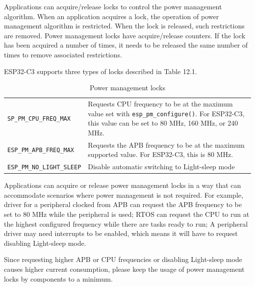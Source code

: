 \documentclass[a4paper,12pt,openany]{book}
\renewcommand{\arraystretch}{1}
\begin{document}
Applications can acquire/release locks to control the power management algorithm. When an application acquires a lock, the operation of power management algorithm is restricted. When the lock is released, such restrictions are removed. Power management locks have acquire/release counters. If the lock has been acquired a number of times, it needs to be released the same number of times to remove associated restrictions.

ESP32-C3 supports three types of locks described in Table 12.1.

\begin{table}[h!]
    \renewcommand{\arraystretch}{1.2}
    \caption{Power management locks}
    \begin{tabular}{|>{\footnotesize}m{}|>{\footnotesize}m{}|}
        \hline
        \rowcolor{LightBlue}\multicolumn{1}{|c|}{\textbf{Power management lock}}&\multicolumn{1}{c|}{\textbf{Description}}\\
        \hline
        \verb|SP_PM_CPU_FREQ_MAX|&Requests CPU frequency to be at the maximum value set with \verb|esp_pm_configure()|. For ESP32-C3, this value can be set to 80 MHz, 160 MHz, or 240 MHz.\\
        \hline
        \verb|ESP_PM_APB_FREQ_MAX|&Requests the APB frequency to be at the maximum supported value. For ESP32-C3, this is 80 MHz.\\
        \hline
        \verb|ESP_PM_NO_LIGHT_SLEEP|&Disable automatic switching to Light-sleep mode\\
        \hline
    \end{tabular}
\end{table}

Applications can acquire or release power management locks in a way that can accommodate scenarios where power management is not required. For example, driver for a peripheral clocked from APB can request the APB frequency to be set to 80 MHz while the peripheral is used; RTOS can request the CPU to run at the highest configured frequency while there are tasks ready to run; A peripheral driver may need interrupts to be enabled, which means it will have to request disabling Light-sleep mode.

Since requesting higher APB or CPU frequencies or disabling Light-sleep mode causes higher current consumption, please keep the usage of power management locks by components to a minimum.
\end{document}
